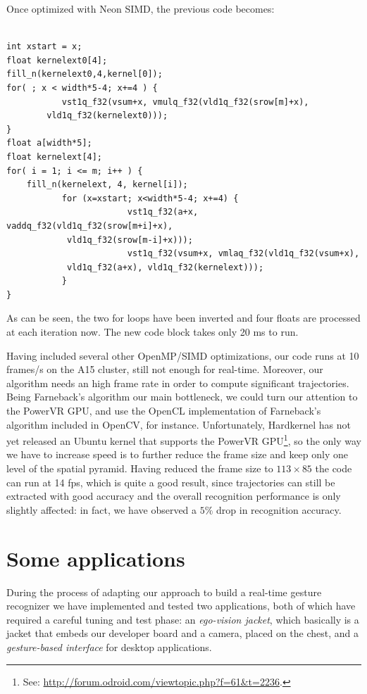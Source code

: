 Once optimized with Neon SIMD, the previous code becomes:
\begin{lstlisting}[frame=single]  % Start your code-block

int xstart = x;
float kernelext0[4];
fill_n(kernelext0,4,kernel[0]);
for( ; x < width*5-4; x+=4 ) {
           vst1q_f32(vsum+x, vmulq_f32(vld1q_f32(srow[m]+x),
		vld1q_f32(kernelext0)));
}
float a[width*5];
float kernelext[4];
for( i = 1; i <= m; i++ ) {
	fill_n(kernelext, 4, kernel[i]);
           for (x=xstart; x<width*5-4; x+=4) {
                        vst1q_f32(a+x, vaddq_f32(vld1q_f32(srow[m+i]+x), 
			vld1q_f32(srow[m-i]+x)));
                        vst1q_f32(vsum+x, vmlaq_f32(vld1q_f32(vsum+x), 
			vld1q_f32(a+x), vld1q_f32(kernelext)));
           }
}
\end{lstlisting}
As can be seen, the two for loops have been inverted and four floats are processed at each iteration now. The new code block takes only 20 ms to run.


Having included several other OpenMP/SIMD optimizations, our code runs at 10 frames/s on the A15 cluster, still not enough for real-time. Moreover, our algorithm needs an high frame rate in order to compute significant trajectories. Being Farneback's algorithm our main bottleneck, we could turn our attention to the PowerVR GPU, and use the OpenCL implementation of Farneback's algorithm included in OpenCV, for instance. Unfortunately, Hardkernel has not yet released an Ubuntu kernel that supports the PowerVR GPU\footnote{See: \url{http://forum.odroid.com/viewtopic.php?f=61&t=2236}.}, so the only way we have to increase speed is to further reduce the frame size and keep only one level of the spatial pyramid. Having reduced the frame size to $113\times 85$ the code can run at 14 fps, which is quite a good result, since trajectories can still be extracted with good accuracy and the overall recognition performance is only slightly affected: in fact, we have observed a $5\%$ drop in recognition accuracy.

\section{Some applications}
During the process of adapting our approach to build a real-time gesture recognizer we have implemented and tested two applications, both of which have required a careful tuning and test phase: an \textit{ego-vision jacket}, which basically is a jacket that embeds our developer board and a camera, placed on the chest, and a \textit{gesture-based interface} for desktop applications.


